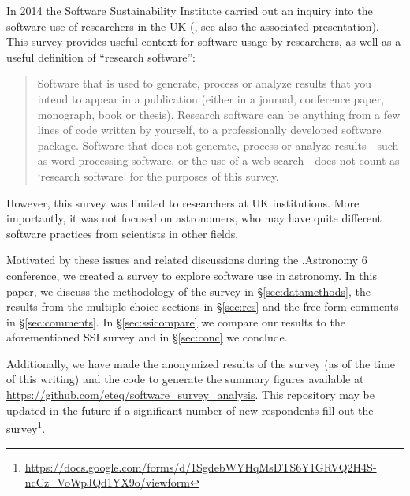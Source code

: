 In 2014 the Software Sustainability Institute carried out an inquiry into the software use of researchers in the UK  (\cite{f824cd98-b953-4c08-96c8-2533188bc4c4}, see also \href{http://wl.figshare.com/articles/1243288/embed?show_title=1}{the associated presentation}). This survey provides useful context for software usage by researchers, as well as a useful definition of ``research software'':
\begin{quote}
Software that is used to generate, process or analyze results that you intend to appear in a publication (either in a journal, conference paper, monograph, book or thesis). Research software can be anything from a few lines of code written by yourself, to a professionally developed software package. Software that does not generate, process or analyze results - such as word processing software, or the use of a web search - does not count as ‘research software’ for the purposes of this survey.
\end{quote}
However, this survey was limited to researchers at UK institutions.  More importantly, it was not focused on astronomers, who may have quite different software practices from scientists in other fields.

Motivated by these issues and related discussions during the .Astronomy 6 conference, we created a survey to explore software use in astronomy.  In this paper, we discuss the methodology of the survey in \S \ref{sec:datamethods}, the results from the multiple-choice sections in \S \ref{sec:res} and the free-form comments in \S \ref{sec:comments}. In \S \ref{sec:ssicompare} we compare our results to the aforementioned SSI survey and in \S \ref{sec:conc} we conclude.

Additionally, we have made the anonymized results of the survey (as of the time of this writing) and the code to generate the summary figures available at \url{https://github.com/eteq/software_survey_analysis}. This repository may be updated in the future if a significant number of new respondents fill out the survey\footnote{\url{https://docs.google.com/forms/d/1SgdebWYHqMsDTS6Y1GRVQ2H4S-ncCz_VoWpJQd1YX9o/viewform}}.
    
  
  
  
  
  
  
  
  
  
  
  